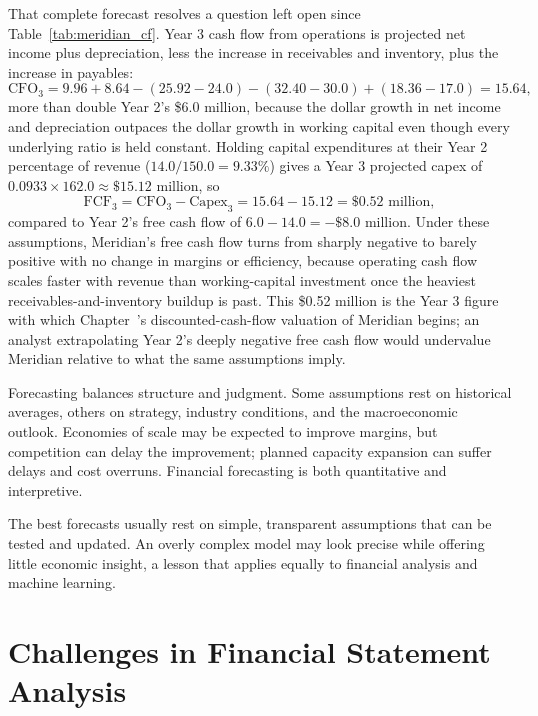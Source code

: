 \documentclass[../ai_in_finance]{subfiles}
\begin{document}
That complete forecast resolves a question left open since Table~\ref{tab:meridian_cf}. Year 3 cash flow from operations is projected net income plus depreciation, less the increase in receivables and inventory, plus the increase in payables:
\begin{equation*}
\text{CFO}_3 = 9.96 + 8.64 - (25.92 - 24.0) - (32.40 - 30.0) + (18.36 - 17.0) = 15.64,
\end{equation*}
more than double Year 2's \$6.0 million, because the dollar growth in net income and depreciation outpaces the dollar growth in working capital even though every underlying ratio is held constant. Holding capital expenditures at their Year 2 percentage of revenue ($14.0/150.0 = 9.33\%$) gives a Year 3 projected capex of $0.0933 \times 162.0 \approx \$15.12$ million, so
\begin{equation*}
\text{FCF}_3 = \text{CFO}_3 - \text{Capex}_3 = 15.64 - 15.12 = \$0.52 \text{ million},
\end{equation*}
compared to Year 2's free cash flow of $6.0 - 14.0 = -\$8.0$ million. Under these assumptions, Meridian's free cash flow turns from sharply negative to barely positive with no change in margins or efficiency, because operating cash flow scales faster with revenue than working-capital investment once the heaviest receivables-and-inventory buildup is past. This \$0.52 million is the Year 3 figure with which Chapter~'s discounted-cash-flow valuation of Meridian begins; an analyst extrapolating Year 2's deeply negative free cash flow would undervalue Meridian relative to what the same assumptions imply.

Forecasting balances structure and judgment. Some assumptions rest on historical averages, others on strategy, industry conditions, and the macroeconomic outlook. Economies of scale may be expected to improve margins, but competition can delay the improvement; planned capacity expansion can suffer delays and cost overruns. Financial forecasting is both quantitative and interpretive.

The best forecasts usually rest on simple, transparent assumptions that can be tested and updated. An overly complex model may look precise while offering little economic insight, a lesson that applies equally to financial analysis and machine learning.

\section{Challenges in Financial Statement Analysis}
\end{document}

